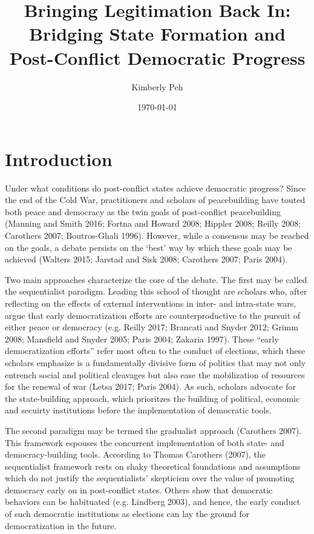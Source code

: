 \documentclass [11pt]{article}
\title{Bringing Legitimation Back In: Bridging State Formation and Post-Conflict Democratic Progress}
\author{Kimberly Peh}
\date{\today}
\begin{document}
\maketitle

\section*{Introduction} 

Under what conditions do post-conflict states achieve democratic progress? Since the end of the Cold War, practitioners and scholars of peacebuilding have touted both peace and democracy as the twin goals of post-conflict peacebuilding (Manning and Smith 2016; Fortna and Howard 2008; Hippler 2008; Reilly 2008; Carothers 2007; Boutros-Ghali 1996). However, while a consensus may be reached on the goals, a debate persists on the `best' way by which these goals may be achieved (Walters 2015; Jarstad and Sisk 2008; Carothers 2007; Paris 2004).

Two main approaches characterize the core of the debate. The first may be called the sequentialist paradigm. Leading this school of thought are scholars who, after reflecting on the effects of external interventions in inter- and intra-state wars, argue that early democratization efforts are counterproductive to the pursuit of either peace or democracy (e.g. Reilly 2017; Brancati and Snyder 2012; Grimm 2008; Mansfield and Snyder 2005; Paris 2004; Zakaria 1997). These ``early democratization efforts'' refer most often to the conduct of elections, which these scholars emphasize is a fundamentally divisive form of politics that may not only entrench social and political cleavages but also ease the mobilization of resources for the renewal of war (Letsa 2017; Paris 2004). As such, scholars advocate for the state-building approach, which prioritzes the building of political, economic and secuirty institutions before the implementation of democratic tools. %

The second paradigm may be termed the gradualist approach (Carothers 2007). This framework espouses the concurrent implementation of both state- and democracy-building tools. According to Thomas Carothers (2007), the sequentialist framework rests on shaky theoretical foundations and assumptions which do not justify the sequentialists' skepticism over the value of promoting democracy early on in post-conflict states. Others show that democratic behaviors can be habituated (e.g. Lindberg 2003), and hence, the early conduct of such democratic institutions as elections can lay the ground for democratization in the future.
\end{document}
